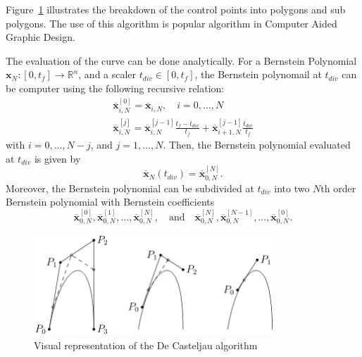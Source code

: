Figure~\ref{fig:deCasteljau} illustrates the breakdown of the control points into polygons and sub polygons. The use of this algorithm is popular algorithm in Computer Aided Graphic Design.
\par The evaluation of the curve can be done analytically. For a Bernstein Polynomial $\boldsymbol{x}_N:[0,t_f]\rightarrow \mathbb{R}^n$, and a scaler $t_{div}\in [0,t_f]$, the Bernstein polynomail at $t_{div}$ can be computer using the following recursive relation:
\begin{equation}
\begin{gathered}
    \overline{\boldsymbol{x}}^{[0]}_{i,N} = \overline{\boldsymbol{x}}_{i,N},\quad i=0,\dots, N  \\
    \overline{\boldsymbol{x}}^{[j]}_{i,N} = \overline{\boldsymbol{x}}^{[j-1]}_{i,N} \frac{t_f-t_{div}}{t_f} + \overline{\boldsymbol{x}}^{[j-1]}_{i+1,N} \frac{t_{div}}{t_f}
\end{gathered}
\end{equation}
with $i=0,\dots, N-j$, and $j=1,\dots, N$. Then, the Bernstein polynomial evaluated at $t_{div}$ is given by
\begin{equation}
    \overline{\boldsymbol{x}}_N(t_{div}) = \overline{\boldsymbol{x}}_{0,N}^{[N]}.
\end{equation}
Moreover, the Bernstein polynomial can be subdivided at $t_{div}$ into two $N$th order Bernstein polynomial with Bernstein coefficients
\begin{equation}
    \overline{\boldsymbol{x}}^{[0]}_{0,N}, \overline{\boldsymbol{x}}^{[1]}_{0,N}, \dots, \overline{\boldsymbol{x}}^{[N]}_{0,N}, \quad \text{and}\quad \overline{\boldsymbol{x}}^{[N]}_{0,N}, \overline{\boldsymbol{x}}^{[N-1]}_{0,N}, \dots, \overline{\boldsymbol{x}}^{[0]}_{0,N}.
\end{equation}

\begin{figure}[h!]
\centering
\includegraphics[width=0.8\textwidth]{Images/deCasteljau.png}
\caption{Visual representation of the De Casteljau algorithm}
\label{fig:deCasteljau}
\end{figure}


